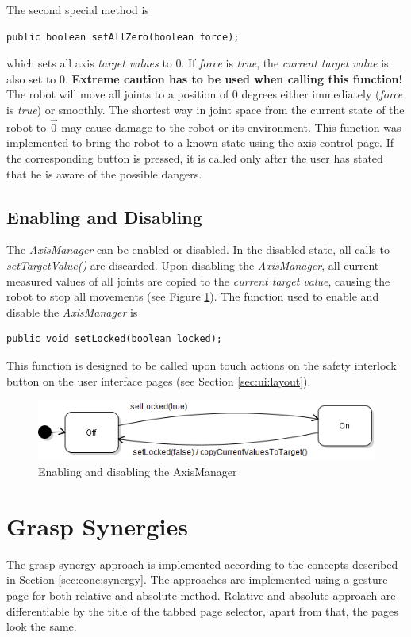 The second special method is
\begin{lstlisting}
public boolean setAllZero(boolean force);
\end{lstlisting}
which sets all axis \textit{target values} to 0. If \textit{force} is \textit{true}, the \textit{current target value} is also set to 0. \textbf{Extreme caution has to be used when calling this function!} The robot will move all joints to a position of 0 degrees either immediately (\textit{force} is \textit{true}) or smoothly. The shortest way in joint space from the current state of the robot to $\vec{0}$ may cause damage to the robot or its environment. This function was implemented to bring the robot to a known state using the axis control page. If the corresponding button is pressed, it is called only after the user has stated that he is aware of the possible dangers.

\subsection{Enabling and Disabling}

The \textit{AxisManager} can be enabled or disabled. In the disabled state, all calls to \textit{setTargetValue()} are discarded. Upon disabling the \textit{AxisManager}, all current measured values of all joints are copied to the \textit{current target value}, causing the robot to stop all movements (see Figure \ref{fig:impl:axisonoff}). The function used to enable and disable the \textit{AxisManager} is
\begin{lstlisting}
public void setLocked(boolean locked);
\end{lstlisting}

This function is designed to be called upon touch actions on the safety interlock button on the user interface pages (see Section \ref{sec:ui:layout}).

\begin{figure}
	\caption{\label{fig:impl:axisonoff}Enabling and disabling the AxisManager}
	\includegraphics[width=0.75\linewidth]{assets/chpt_impl/sw/AxisManager_onoff}
\end{figure}

\section{Grasp Synergies}
The grasp synergy approach is implemented according to the concepts described in Section \ref{sec:conc:synergy}. The approaches are implemented using a gesture page for both relative and absolute method. Relative and absolute approach are differentiable by the title of the tabbed page selector, apart from that, the pages look the same.

